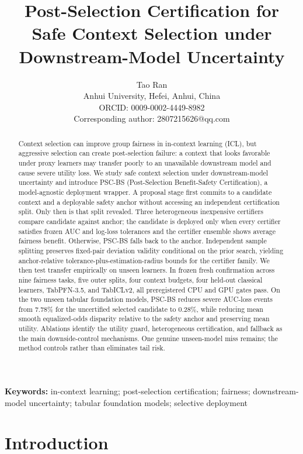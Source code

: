 \documentclass[10pt]{article}
\title{Post-Selection Certification for Safe Context Selection under Downstream-Model Uncertainty}
\author{Tao Ran\\Anhui University, Hefei, Anhui, China\\ORCID: 0009-0002-4449-8982\\Corresponding author: 2807215626@qq.com}
\date{}
\newcommand{\PSC}{\textsc{PSC-BS}}
\begin{document}
\maketitle

\begin{abstract}
Context selection can improve group fairness in in-context learning (ICL), but aggressive selection can create post-selection failure: a context that looks favorable under proxy learners may transfer poorly to an unavailable downstream model and cause severe utility loss.
We study safe context selection under downstream-model uncertainty and introduce \PSC{} (Post-Selection Benefit-Safety Certification), a model-agnostic deployment wrapper.
A proposal stage first commits to a candidate context and a deployable safety anchor without accessing an independent certification split.
Only then is that split revealed.
Three heterogeneous inexpensive certifiers compare candidate against anchor; the candidate is deployed only when every certifier satisfies frozen AUC and log-loss tolerances and the certifier ensemble shows average fairness benefit.
Otherwise, \PSC{} falls back to the anchor.
Independent sample splitting preserves fixed-pair deviation validity conditional on the prior search, yielding anchor-relative tolerance-plus-estimation-radius bounds for the certifier family.
We then test transfer empirically on unseen learners.
In frozen fresh confirmation across nine fairness tasks, five outer splits, four context budgets, four held-out classical learners, TabPFN-3.5, and TabICLv2, all preregistered CPU and GPU gates pass.
On the two unseen tabular foundation models, \PSC{} reduces severe AUC-loss events from 7.78\% for the uncertified selected candidate to 0.28\%, while reducing mean smooth equalized-odds disparity relative to the safety anchor and preserving mean utility.
Ablations identify the utility guard, heterogeneous certification, and fallback as the main downside-control mechanisms.
One genuine unseen-model miss remains; the method controls rather than eliminates tail risk.
\end{abstract}

\noindent\textbf{Keywords:} in-context learning; post-selection certification; fairness; downstream-model uncertainty; tabular foundation models; selective deployment

\section{Introduction}
\end{document}
